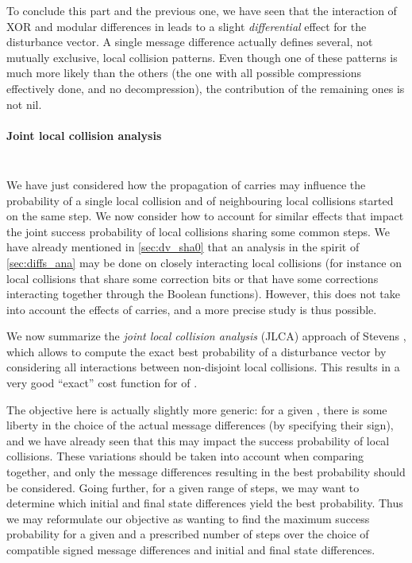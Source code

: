 \medskip

To conclude this part and the previous one, we have seen that the interaction of XOR and modular differences in \sha leads to a slight \emph{differential} effect for the disturbance vector. A single
message difference actually defines several, not mutually exclusive, local collision patterns. Even though one of these patterns is much more likely than the others (\ie the one with all possible compressions
effectively done, and no decompression), the contribution of the remaining ones is not nil.

\paragraph{Joint local collision analysis}
$\phantom{bouh}$

\medskip

\noindent
We have just considered how the propagation of carries may influence the probability of a single local collision and of neighbouring local collisions started on the same step. We now consider how to account for similar effects
that impact the joint success probability of local collisions sharing some common steps. We have already mentioned in \autoref{sec:dv_sha0} that an analysis in the spirit of \autoref{sec:diffs_ana} may be done
on closely interacting local collisions (for instance on local collisions that share some correction bits or that have some corrections interacting together through the Boolean functions).
However, this does not take into account the effects of carries, and a more precise study is thus
possible.

We now summarize the \emph{joint local collision analysis} (JLCA) approach of Stevens \cite{phdstevens,DBLP:conf/eurocrypt/Stevens13}, which allows to compute the exact best probability of a disturbance vector
by considering all interactions between non-disjoint local collisions. This results in a very good ``exact'' cost function for \dvs of \shaone.

\medskip

The objective here is actually slightly more generic: for a given \dv, there is some liberty in the choice of the actual message differences (\eg by specifying their sign), and we have already seen that this
may impact the success probability of local collisions. These variations should be taken into account when comparing \dvs together, and only the message differences resulting in the best probability should
be considered. Going further, for a given range of steps, we may want to determine which initial and final state differences yield the best probability.
Thus we may reformulate our objective as wanting to find the maximum success probability for a given \dv and a prescribed number of steps over the choice of compatible signed message differences and initial
and final state differences.

